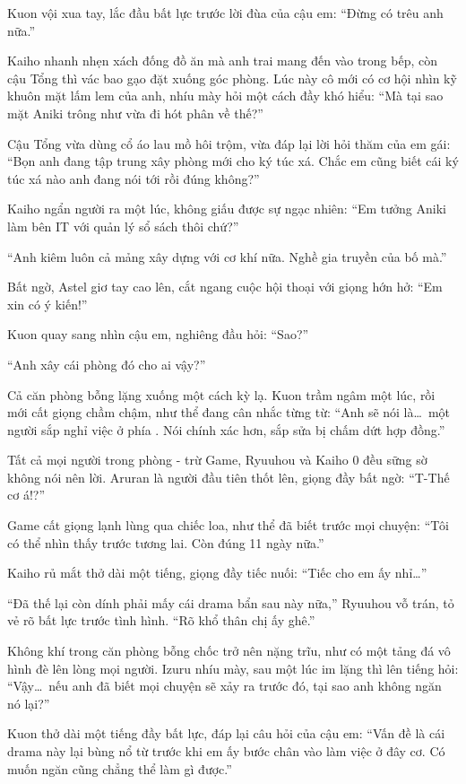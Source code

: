 \documentclass[../main.tex]{subfiles}
\begin{document}
Kuon vội xua tay, lắc đầu bất lực trước lời đùa của cậu em: ``Đừng có trêu anh nữa.''

Kaiho nhanh nhẹn xách đống đồ ăn mà anh trai mang đến vào trong bếp, còn cậu Tổng thì vác bao gạo đặt xuống góc phòng. Lúc này cô mới có cơ hội nhìn kỹ khuôn mặt lấm lem của anh, nhíu mày hỏi một cách đầy khó hiểu: ``Mà tại sao mặt Aniki trông như vừa đi hót phân về thế?''

Cậu Tổng vừa dùng cổ áo lau mồ hôi trộm, vừa đáp lại lời hỏi thăm của em gái: ``Bọn anh đang tập trung xây phòng mới cho ký túc xá. Chắc em cũng biết cái ký túc xá nào anh đang nói tới rồi đúng không?''

Kaiho ngẩn người ra một lúc, không giấu được sự ngạc nhiên: ``Em tưởng Aniki làm bên IT với quản lý sổ sách thôi chứ?''

``Anh kiêm luôn cả mảng xây dựng với cơ khí nữa. Nghề gia truyền của bố mà.''

Bất ngờ, Astel giơ tay cao lên, cắt ngang cuộc hội thoại với giọng hớn hở: ``Em xin có ý kiến!''

Kuon quay sang nhìn cậu em, nghiêng đầu hỏi: ``Sao?''

``Anh xây cái phòng đó cho ai vậy?''

Cả căn phòng bỗng lặng xuống một cách kỳ lạ. Kuon trầm ngâm một lúc, rồi mới cất giọng chầm chậm, như thể đang cân nhắc từng từ: ``Anh sẽ nói là\dots\ một người sắp nghỉ việc ở phía \hll. Nói chính xác hơn, sắp sửa bị chấm dứt hợp đồng.''

Tất cả mọi người trong phòng - trừ Game, Ryuuhou và Kaiho 0 đều sững sờ không nói nên lời. Aruran là người đầu tiên thốt lên, giọng đầy bất ngờ: ``T-Thế cơ á!?''

Game cất giọng lạnh lùng qua chiếc loa, như thể đã biết trước mọi chuyện: ``Tôi có thể nhìn thấy trước tương lai. Còn đúng 11 ngày nữa.''

Kaiho rủ mắt thở dài một tiếng, giọng đầy tiếc nuối: ``Tiếc cho em ấy nhỉ\dots''

``Đã thế lại còn dính phải mấy cái drama bẩn sau này nữa,'' Ryuuhou vỗ trán, tỏ vẻ rõ bất lực trước tình hình. ``Rõ khổ thân chị ấy ghê.''

Không khí trong căn phòng bỗng chốc trở nên nặng trĩu, như có một tảng đá vô hình đè lên lòng mọi người. Izuru nhíu mày, sau một lúc im lặng thì lên tiếng hỏi: ``Vậy\dots\ nếu anh đã biết mọi chuyện sẽ xảy ra trước đó, tại sao anh không ngăn nó lại?''

Kuon thở dài một tiếng đầy bất lực, đáp lại câu hỏi của cậu em: ``Vấn đề là cái drama này lại bùng nổ từ trước khi em ấy bước chân vào làm việc ở đây cơ. Có muốn ngăn cũng chẳng thể làm gì được.''
\end{document}
